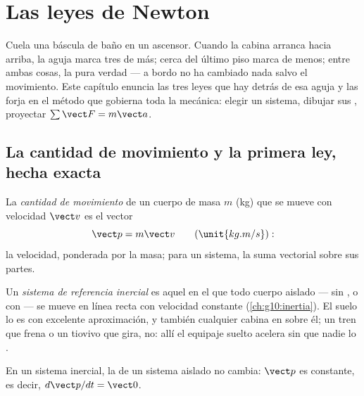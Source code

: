 \chapter{Las leyes de Newton}\label{ch:g12:newtons-laws}

Cuela una báscula de baño en un ascensor. Cuando la cabina arranca hacia arriba, la
aguja marca tres  de más; cerca del último piso marca de menos; entre ambas
cosas, la pura verdad --- a bordo no ha cambiado nada salvo el movimiento. Este
capítulo enuncia las tres leyes que hay detrás de esa aguja y las forja en el método
que gobierna toda la mecánica: elegir un sistema, dibujar sus , proyectar
$\sum \vect F = m\vect a$.

\section{La cantidad de movimiento y la primera ley, hecha exacta}

\begin{definition}\label{def:g12:newtons-laws:momentum}
La \emph{cantidad de movimiento} de un cuerpo de masa
$m$ (\unit{kg}) que se mueve con velocidad $\vect v$ es el vector
\[
\vect p = m \vect v \qquad (\unit{kg.m/s}):
\]
la velocidad, ponderada por la masa; para un sistema, la suma vectorial sobre sus
partes.
\end{definition}

\begin{definition}\label{def:g12:newtons-laws:inertial}
Un \emph{sistema de referencia inercial} es
aquel en el que todo cuerpo aislado --- sin , o con 
--- se mueve en línea recta con velocidad constante (\cref{ch:g10:inertia}). El suelo
lo es con excelente aproximación, y también cualquier cabina en  sobre él; un tren que frena o un tiovivo que gira, no: allí el equipaje
suelto acelera sin que nadie lo .
\end{definition}

\begin{theorem}\label{thm:g12:newtons-laws:first}
En un sistema inercial, la  de un sistema aislado no cambia:
$\vect p$ es constante, es decir, $d\vect p/dt = \vect 0$.
\end{theorem}
\admitted

